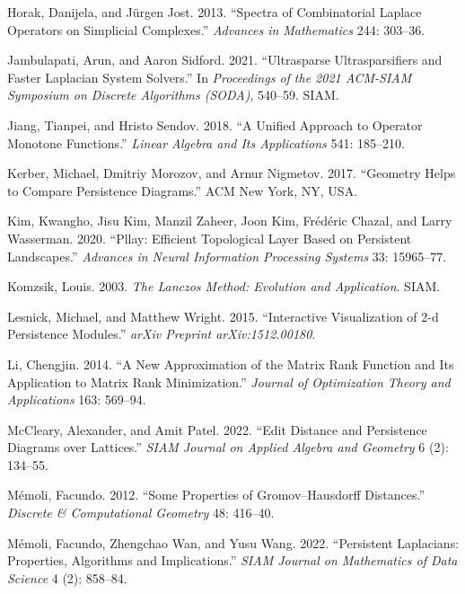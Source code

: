 \documentclass[
  letterpaper,
  DIV=11,
  numbers=noendperiod,
  oneside]{scrartcl}
\begin{document}
\begin{CSLReferences}
Horak, Danijela, and Jürgen Jost. 2013. {``Spectra of Combinatorial
Laplace Operators on Simplicial Complexes.''} \emph{Advances in
Mathematics} 244: 303--36.

Jambulapati, Arun, and Aaron Sidford. 2021. {``Ultrasparse
Ultrasparsifiers and Faster Laplacian System Solvers.''} In
\emph{Proceedings of the 2021 ACM-SIAM Symposium on Discrete Algorithms
(SODA)}, 540--59. SIAM.

Jiang, Tianpei, and Hristo Sendov. 2018. {``A Unified Approach to
Operator Monotone Functions.''} \emph{Linear Algebra and Its
Applications} 541: 185--210.

Kerber, Michael, Dmitriy Morozov, and Arnur Nigmetov. 2017. {``Geometry
Helps to Compare Persistence Diagrams.''} ACM New York, NY, USA.

Kim, Kwangho, Jisu Kim, Manzil Zaheer, Joon Kim, Frédéric Chazal, and
Larry Wasserman. 2020. {``Pllay: Efficient Topological Layer Based on
Persistent Landscapes.''} \emph{Advances in Neural Information
Processing Systems} 33: 15965--77.

Komzsik, Louis. 2003. \emph{The Lanczos Method: Evolution and
Application}. SIAM.

Lesnick, Michael, and Matthew Wright. 2015. {``Interactive Visualization
of 2-d Persistence Modules.''} \emph{arXiv Preprint arXiv:1512.00180}.

Li, Chengjin. 2014. {``A New Approximation of the Matrix Rank Function
and Its Application to Matrix Rank Minimization.''} \emph{Journal of
Optimization Theory and Applications} 163: 569--94.

McCleary, Alexander, and Amit Patel. 2022. {``Edit Distance and
Persistence Diagrams over Lattices.''} \emph{SIAM Journal on Applied
Algebra and Geometry} 6 (2): 134--55.

Mémoli, Facundo. 2012. {``Some Properties of Gromov--Hausdorff
Distances.''} \emph{Discrete \& Computational Geometry} 48: 416--40.

Mémoli, Facundo, Zhengchao Wan, and Yusu Wang. 2022. {``Persistent
Laplacians: Properties, Algorithms and Implications.''} \emph{SIAM
Journal on Mathematics of Data Science} 4 (2): 858--84.


\end{CSLReferences}
\end{document}
